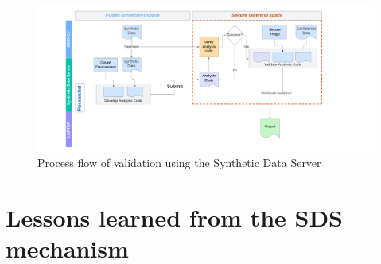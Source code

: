 \documentclass[inline]{hdsr}
\begin{document}
\begin{figure}
    \centering
    \includegraphics[width=\textwidth]{SSB Flow.png}
    \caption{Process flow of validation using the Synthetic Data Server}
    \label{fig:ssb-flow}
\end{figure}




\section{Lessons learned from the SDS mechanism}
\end{document}
